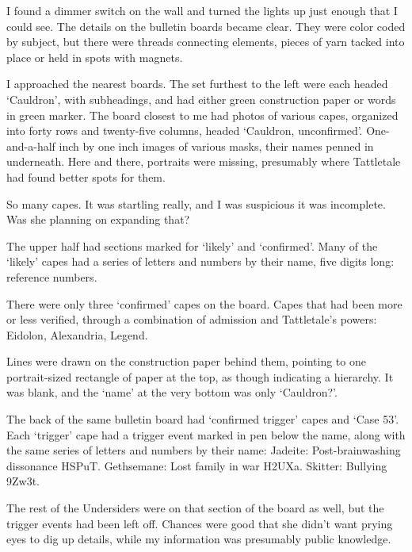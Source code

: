 I found a dimmer switch on the wall and turned the lights up just enough that I could see.  The details on the bulletin boards became clear.  They were color coded by subject, but there were threads connecting elements, pieces of yarn tacked into place or held in spots with magnets.



I approached the nearest boards.  The set furthest to the left were each headed `Cauldron', with subheadings, and had either green construction paper or words in green marker.  The board closest to me had photos of various capes, organized into forty rows and twenty-five columns, headed `Cauldron, unconfirmed'.  One-and-a-half inch by one inch images of various masks, their names penned in underneath.  Here and there, portraits were missing, presumably where Tattletale had found better spots for them.



So many capes.  It was startling really, and I was suspicious it was incomplete.  Was she planning on expanding that?



The upper half had sections marked for `likely' and `confirmed'.  Many of the `likely' capes had a series of letters and numbers by their name, five digits long: reference numbers.



There were only three `confirmed' capes on the board.  Capes that had been more or less verified, through a combination of admission and Tattletale's powers:  Eidolon, Alexandria, Legend.



Lines were drawn on the construction paper behind them, pointing to one portrait-sized rectangle of paper at the top, as though indicating a hierarchy.  It was blank, and the `name' at the very bottom was only `Cauldron?'.



The back of the same bulletin board had `confirmed trigger' capes and `Case 53'.  Each `trigger' cape had a trigger event marked in pen below the name, along with the same series of letters and numbers by their name:  Jadeite: Post-brainwashing dissonance HSPuT.  Gethsemane: Lost family in war H2UXa.  Skitter: Bullying 9Zw3t.



The rest of the Undersiders were on that section of the board as well, but the trigger events had been left off.  Chances were good that she didn't want prying eyes to dig up details, while my information was presumably public knowledge.



